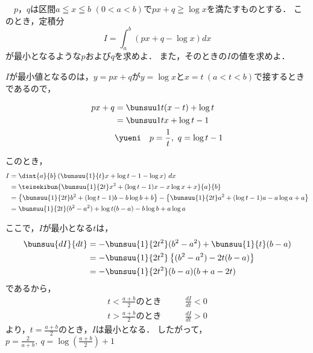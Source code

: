\begin{problem}
  　$p$，$q$は区間$a \leqq x \leqq b$ $(0<a<b)$で$px+q\geqq\log x$を満たすものとする．
このとき，定積分
\[ I=\int_a^b(px+q-\log x)dx \]
が最小となるような$p$および$q$を求めよ．
また，そのときの$I$の値を求めよ．
\end{problem}

\noindent\kaie

$I$が最小値となるのは，$y = px + q$が$y = \log x$と$x=t\ (a<t<b)$で接するときであるので，

\begin{align*}
  px+q &= \bunsuu1{t}(x-t) + \log t\\
  &= \bunsuu1{t}x + \log t - 1 \\
  &\yueni\quad p = \frac1{t},\ q = \log t -1
\end{align*}

このとき，
\begin{align*}
  I &= \dint{a}{b}\left(\bunsuu{1}{t}x + \log t - 1 - \log x\right)\,dx \\
  &= \teisekibun{\bunsuu{1}{2t}x^2 + (\log t - 1)x - x\log x + x}{a}{b} \\
  &= \left\{\bunsuu{1}{2t}b^2 + (\log t -1)b - b\log b + b\right\}
  -\left\{\bunsuu{1}{2t}a^2 + (\log t - 1)a - a\log a + a\right\} \\
  &= \bunsuu{1}{2t}(b^2-a^2) + \log t(b-a) - b\log b + a\log a\\
\end{align*}

ここで，$I$が最小となる$t$は，
\begin{align*}
  \bunsuu{dI}{dt} &= -\bunsuu{1}{2t^2}(b^2-a^2) + \bunsuu{1}{t}(b-a) \\
  &= -\bunsuu{1}{2t^2}\left\{(b^2-a^2) - 2t(b-a)\right\} \\
  &= -\bunsuu{1}{2t^2}(b-a)(b+a-2t)
\end{align*}
であるから，
\begin{align*}
  t < \frac{a+b}{2} のとき \qquad&\frac{dI}{dt} < 0\\
  t > \frac{a+b}{2} のとき \qquad&\frac{dI}{dt} > 0
\end{align*}
より，$t = \frac{a+b}{2}$のとき，$I$は最小となる．
したがって，$p = \frac{2}{a+b},\ q = \log \left(\frac{a+b}{2}\right) + 1$

